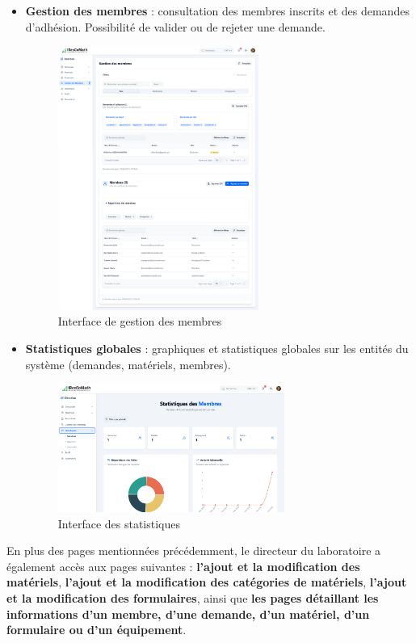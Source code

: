 \begin{itemize}
    \item \textbf{Gestion des membres} : consultation des membres inscrits et des demandes d’adhésion. Possibilité de valider ou de rejeter une demande.
    \begin{figure}[H]
        \centering
        \includegraphics[width=0.62\textwidth]{images/interface/Membres.png}
        \caption{Interface de gestion des membres}
        \label{fig:gestion_membres_directeur}
    \end{figure}

    \item \textbf{Statistiques globales} : graphiques et statistiques globales sur les entités du système (demandes, matériels,  membres).
    \begin{figure}[H]
        \centering
        \includegraphics[width=0.7\textwidth]{images/interface/Statistiques.png}
        \caption{Interface des statistiques}
        \label{fig:statistiques}
    \end{figure}
\end{itemize}
En plus des pages mentionnées précédemment, le directeur du laboratoire a également accès aux pages suivantes : \textbf{l’ajout et la modification des matériels}, \textbf{l’ajout et la modification des catégories de matériels}, \textbf{l’ajout et la modification des formulaires}, ainsi que \textbf{les pages détaillant les informations d’un membre, d’une demande, d’un matériel, d’un formulaire ou d’un équipement}.

